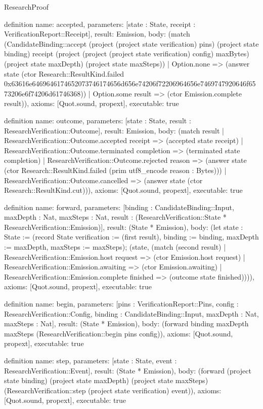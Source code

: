 \begin{lexlean}{ResearchProof}
\begin{semanticmodule}
definition{
 name: accepted,
 parameters: [state : State, receipt : VerificationReport::Receipt],
 result: Emission,
 body: (match (CandidateBinding::accept (project (project state verification) pins) (project state binding) receipt (project (project (project state verification) config) maxBytes) (project state maxDepth) (project state maxSteps)) | Option.none => (answer state (ctor Research::ResultKind.failed 0x63616e6469646174652073746174656d656e74206f72206964656e7469747920646f6573206e6f74206d61746368)) | Option.some result => (ctor Emission.complete result)),
 axioms: [Quot.sound, propext],
 executable: true
}

definition{
 name: outcome,
 parameters: [state : State, result : ResearchVerification::Outcome],
 result: Emission,
 body: (match result | ResearchVerification::Outcome.accepted receipt => (accepted state receipt) | ResearchVerification::Outcome.terminated completion => (terminated state completion) | ResearchVerification::Outcome.rejected reason => (answer state (ctor Research::ResultKind.failed (prim utf8_encode reason : Bytes))) | ResearchVerification::Outcome.cancelled => (answer state (ctor Research::ResultKind.cut))),
 axioms: [Quot.sound, propext],
 executable: true
}

definition{
 name: forward,
 parameters: [binding : CandidateBinding::Input, maxDepth : Nat, maxSteps : Nat, result : (ResearchVerification::State * ResearchVerification::Emission)],
 result: (State * Emission),
 body: (let state : State := (record State {verification := (first result), binding := binding, maxDepth := maxDepth, maxSteps := maxSteps}); (state, (match (second result) | ResearchVerification::Emission.host request => (ctor Emission.host request) | ResearchVerification::Emission.awaiting => (ctor Emission.awaiting) | ResearchVerification::Emission.complete finished => (outcome state finished)))),
 axioms: [Quot.sound, propext],
 executable: true
}

definition{
 name: begin,
 parameters: [pins : VerificationReport::Pins, config : ResearchVerification::Config, binding : CandidateBinding::Input, maxDepth : Nat, maxSteps : Nat],
 result: (State * Emission),
 body: (forward binding maxDepth maxSteps (ResearchVerification::begin pins config)),
 axioms: [Quot.sound, propext],
 executable: true
}

definition{
 name: step,
 parameters: [state : State, event : ResearchVerification::Event],
 result: (State * Emission),
 body: (forward (project state binding) (project state maxDepth) (project state maxSteps) (ResearchVerification::step (project state verification) event)),
 axioms: [Quot.sound, propext],
 executable: true
}


\end{semanticmodule}
\end{lexlean}
